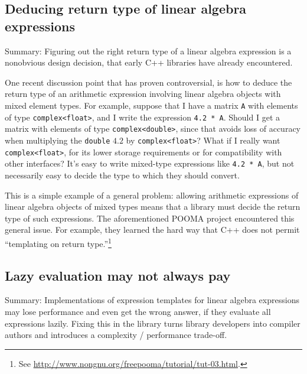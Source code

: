 \subsection{Deducing return type of linear algebra expressions}
\label{SS:features:return-type-deduction}

Summary: Figuring out the right return type of a linear algebra
expression is a nonobvious design decision, that early C++ libraries
have already encountered.

One recent discussion point that has proven controversial, is how to
deduce the return type of an arithmetic expression involving linear
algebra objects with mixed element types.  For example, suppose that I
have a matrix \texttt{A} with elements of type
\texttt{complex<float>}, and I write the expression \texttt{4.2 * A}.
Should I get a matrix with elements of type \texttt{complex<double>},
since that avoids loss of accuracy when multiplying the
\texttt{double} $4.2$ by \texttt{complex<float>}?  What if I really
want \texttt{complex<float>}, for its lower storage requirements or
for compatibility with other interfaces?  It's easy to write
mixed-type expressions like \texttt{4.2 * A}, but not necessarily easy
to decide the type to which they should convert.

This is a simple example of a general problem: allowing arithmetic
expressions of linear algebra objects of mixed types means that a
library must decide the return type of such expressions.  The
aforementioned POOMA project encountered this general issue.  For
example, they learned the hard way that C++ does not permit
``templating on return type.''\footnote{See
  \url{http://www.nongnu.org/freepooma/tutorial/tut-03.html}.}

\subsection{Lazy evaluation may not always pay}
\label{SS:features:lazy}

Summary: Implementations of expression templates for linear algebra
expressions may lose performance and even get the wrong answer, if
they evaluate all expressions lazily.  Fixing this in the library
turns library developers into compiler authors and introduces a
complexity / performance trade-off.

